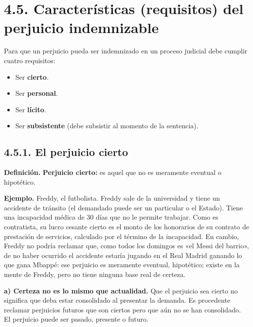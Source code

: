 \section{4.5. Características (requisitos) del perjuicio indemnizable}
Para que un perjuicio pueda ser indemnizado en un proceso judicial debe cumplir cuatro requisitos:

\begin{itemize}
\item Ser \textbf{cierto}.
\item Ser \textbf{personal}.
\item Ser \textbf{lícito}.
\item Ser \textbf{subsistente} (debe subsistir al momento de la sentencia).
\end{itemize}
\subsection{4.5.1. El perjuicio cierto}
\begin{definicion}
\textcolor[HTML]{1F3864}{\textbf{Definición. }}\textbf{Perjuicio cierto: }es aquel que no es meramente eventual o hipotético.
\end{definicion}
\begin{ejemplo}
\textcolor[HTML]{4F6228}{\textbf{Ejemplo. }}Freddy, el futbolista. Freddy sale de la universidad y tiene un accidente de tránsito (el demandado puede ser un particular o el Estado). Tiene una incapacidad médica de 30 días que no le permite trabajar. Como es contratista, su lucro cesante cierto es el monto de los honorarios de su contrato de prestación de servicios, calculado por el término de la incapacidad. En cambio, Freddy no podría reclamar que, como todos los domingos es «el Messi del barrio», de no haber ocurrido el accidente estaría jugando en el Real Madrid ganando lo que gana Mbappé: ese perjuicio es meramente eventual, hipotético; existe en la mente de Freddy, pero no tiene ninguna base real de certeza.
\end{ejemplo}
\textbf{a) Certeza no es lo mismo que actualidad.} Que el perjuicio sea cierto no significa que deba estar consolidado al presentar la demanda. Es procedente reclamar perjuicios futuros que son ciertos pero que aún no se han consolidado. El perjuicio puede ser pasado, presente o futuro.

